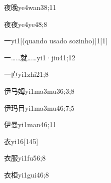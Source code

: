 \begin{verbete}{夜晚}{ye4wan3}{8;11}
\end{verbete}

\begin{verbete}{夜夜}{ye4ye4}{8;8}
\end{verbete}

\begin{verbete}{一}{yi1}[(quando usado sozinho)]{1}[1]
\end{verbete}

\begin{verbete}{一……就……}{yi1·jiu4}{1;12}
\end{verbete}

\begin{verbete}{一直}{yi1zhi2}{1;8}
\end{verbete}

\begin{verbete}{伊马姆}{yi1ma3mu3}{6;3;8}
\end{verbete}

\begin{verbete}{伊玛目}{yi1ma3mu4}{6;7;5}
\end{verbete}

\begin{verbete}{伊曼}{yi1man4}{6;11}
\end{verbete}

\begin{verbete}{衣}{yi1}{6}[145]
\end{verbete}

\begin{verbete}{衣服}{yi1fu5}{6;8}
\end{verbete}

\begin{verbete}{衣柜}{yi1gui4}{6;8}
\end{verbete}

